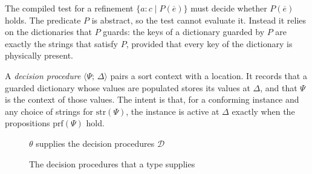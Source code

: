 \documentclass[11pt]{article}
\newcommand{\kw}[1]{\mathsf{#1}}
\newcommand{\prf}[1]{\kw{prf}\;#1}
\newcommand{\pred}[1]{\kw{pred}\;#1}
\newcommand{\proper}{\ast}
\newcommand{\populated}{\ast^{+}}
\newcommand{\gdict}[4]{\{[#1 : #2]\ #3 : #4\}}
\newcommand{\refine}[3]{\{#1 : #2 \mid #3\}}
\newcommand{\iabs}[3]{\lambda #1 : #2.\,#3}
\newcommand{\union}[1]{\textstyle\bigcup #1}
\newcommand{\emptyctx}{\diamond}
\newcommand{\kinding}[4]{#1 \mid #2 \vdash #3 : #4}
\newcommand{\rulename}[1]{\textsc{#1}}
\newcommand{\dproc}[2]{\langle #1;\, #2 \rangle}
\newcommand{\supplies}[4]{#1;\, #2 \vdash #3 \Uparrow #4}
\newcommand{\judgmentbox}[2]{\medskip\noindent\fbox{$#1$}\quad #2\par\vspace{-1.2\baselineskip}}
\theoremstyle{remark}
\begin{document}
The compiled test for a refinement $\refine{a}{c}{P(\overline{e})}$ must decide whether
$P(\overline{e})$ holds. The predicate $P$ is abstract, so the test cannot evaluate it. Instead it
relies on the dictionaries that $P$ guards: the keys of a dictionary guarded by $P$ are exactly the
strings that satisfy $P$, provided that every key of the dictionary is physically present.

A \emph{decision procedure} $\dproc{\Psi}{\Delta}$ pairs a sort context with a location. It records
that a guarded dictionary whose values are populated stores its values at $\Delta$, and that
$\Psi$ is the context of those values. The intent is that, for a conforming instance and any choice
of strings for $\mathrm{str}(\Psi)$, the instance is active at $\Delta$ exactly when the
propositions $\mathrm{prf}(\Psi)$ hold.

\begin{figure}[!htbp]
\judgmentbox{\supplies{\Omega}{\Delta}{\theta}{\mathcal{D}}}{$\theta$ supplies the decision procedures $\mathcal{D}$}
\caption{The decision procedures that a type supplies}
\label{fig:supplies}
\end{figure}
\end{document}

